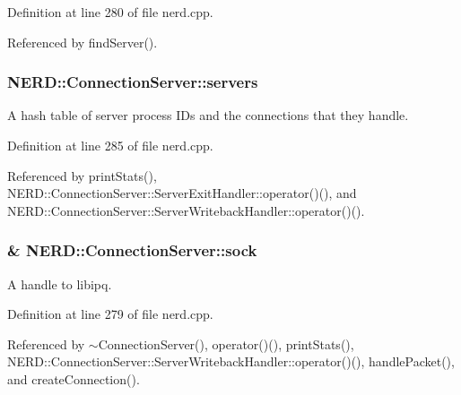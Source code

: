 \-Definition at line 280 of file nerd.\-cpp.



\-Referenced by find\-Server().

\hypertarget{classNERD_1_1ConnectionServer_a990a4882c5123f35208d36cabb5fef67}{
\subsubsection[{servers}]{ {\bf \-N\-E\-R\-D\-::\-Connection\-Server\-::servers}}}
\label{classNERD_1_1ConnectionServer_a990a4882c5123f35208d36cabb5fef67}


\-A hash table of server process \-I\-Ds and the connections that they handle. 



\-Definition at line 285 of file nerd.\-cpp.



\-Referenced by print\-Stats(), \-N\-E\-R\-D\-::\-Connection\-Server\-::\-Server\-Exit\-Handler\-::operator()(), and \-N\-E\-R\-D\-::\-Connection\-Server\-::\-Server\-Writeback\-Handler\-::operator()().

\hypertarget{classNERD_1_1ConnectionServer_ad9575a11fd2db34b92ab1627c2d1d5b0}{
\subsubsection[{sock}]{\& {\bf \-N\-E\-R\-D\-::\-Connection\-Server\-::sock}}}
\label{classNERD_1_1ConnectionServer_ad9575a11fd2db34b92ab1627c2d1d5b0}


\-A handle to libipq. 



\-Definition at line 279 of file nerd.\-cpp.



\-Referenced by $\sim$\-Connection\-Server(), operator()(), print\-Stats(), \-N\-E\-R\-D\-::\-Connection\-Server\-::\-Server\-Writeback\-Handler\-::operator()(), handle\-Packet(), and create\-Connection().

